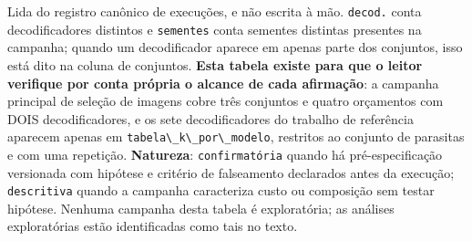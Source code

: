 \footnotesize Lida do registro canônico de execuções, e não escrita à mão. \texttt{decod.} conta decodificadores distintos e \texttt{sementes} conta sementes distintas presentes na campanha; quando um decodificador aparece em apenas parte dos conjuntos, isso está dito na coluna de conjuntos. \textbf{Esta tabela existe para que o leitor verifique por conta própria o alcance de cada afirmação}: a campanha principal de seleção de imagens cobre três conjuntos e quatro orçamentos com DOIS decodificadores, e os sete decodificadores do trabalho de referência aparecem apenas em \texttt{tabela\textbackslash{}\_k\textbackslash{}\_por\textbackslash{}\_modelo}, restritos ao conjunto de parasitas e com uma repetição. \textbf{Natureza}: \texttt{confirmatória} quando há pré-especificação versionada com hipótese e critério de falseamento declarados antes da execução; \texttt{descritiva} quando a campanha caracteriza custo ou composição sem testar hipótese. Nenhuma campanha desta tabela é exploratória; as análises exploratórias estão identificadas como tais no texto.
\normalsize
